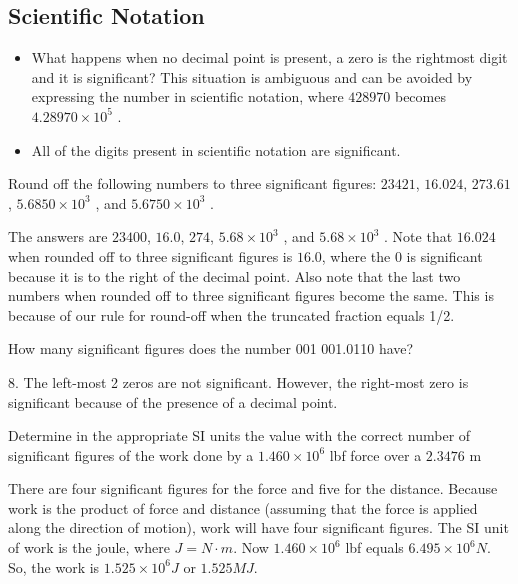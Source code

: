 \subsection*{Scientific Notation}

\begin{itemize}
\item What happens when no decimal point is present, a zero is the rightmost digit and it is significant? This situation is ambiguous and can be avoided by expressing the number in scientific notation, where $428 970$ becomes $4.289 70 \times 10^5$ .
\item All of the digits present in scientific notation are significant. 
\end{itemize}

\begin{question}
Round off the following numbers to three significant figures: $23 421$,
$16.024$, $273.61$, $5.6850 \times 10^3$ , and $5.6750 \times 10^3$ .
\examspace{5em}

\end{question}
\begin{solution}
The answers are $23 400$, $16.0$, $274$, $5.68 \times 10^3$ , and $5.68 \times 10^3$ . Note that
$16.024$ when rounded off to three significant figures is $16.0$, where the 0 is significant
because it is to the right of the decimal point. Also note that the last two numbers
when rounded off to three significant figures become the same. This is because of our
rule for round-off when the truncated fraction equals 1/2.

\end{solution}


\begin{question}
How many significant figures does the number 001 001.0110 have?
\examspace{5em}

\end{question}
\begin{solution}
8. The left-most 2 zeros are not significant. However, the right-most zero is
significant because of the presence of a decimal point.

\end{solution}


\begin{question}
Determine in the appropriate SI units the value with the correct number
of significant figures of the work done by a $1.460 \times 10^6$ lbf force over a $2.3476$ m
\examspace{5em}

\end{question}
\begin{solution}
There are four significant figures for the force and five for the distance.
Because work is the product of force and distance (assuming that the force is applied
along the direction of motion), work will have four significant figures. The SI unit of
work is the joule, where $J = N \cdot m$. Now $1.460 \times 10^6$ lbf equals $6.495 \times 10^6 N$. So, the
work is $1.525 \times 10^6 J$ or $1.525 MJ$.

\end{solution}